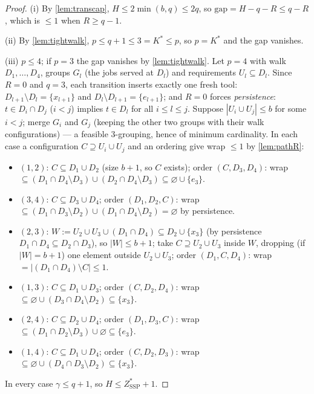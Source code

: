 \documentclass[11pt,a4paper]{article}
\theoremstyle{plain}
\theoremstyle{definition}
\newcommand{\Kstar}{K^{*}}
\newcommand{\ZSSP}{Z_{\mathrm{SSP}}^{*}}
\begin{document}
\begin{proofbox}
\begin{proof}
(i) By \cref{lem:transcap}, $H\le2\min(b,q)\le2q$, so
$\mathrm{gap}=H-q-R\le q-R$, which is $\le1$ when $R\ge q-1$.

(ii) By \cref{lem:tightwalk}, $p\le q+1\le3=\Kstar\le p$, so $p=\Kstar$ and the
gap vanishes.

(iii) $p\le4$; if $p=3$ the gap vanishes by \cref{lem:tightwalk}. Let $p=4$ with
walk $D_1,\dots,D_4$, groups $G_l$ (the jobs served at $D_l$) and requirements
$U_l\subseteq D_l$. Since $R=0$ and $q=3$, each transition inserts exactly one
fresh tool: $D_{l+1}\setminus D_l=\{x_{l+1}\}$ and $D_l\setminus D_{l+1}=
\{e_{l+1}\}$; and $R=0$ forces \emph{persistence}: $t\in D_i\cap D_j$ ($i<j$)
implies $t\in D_l$ for all $i\le l\le j$. Suppose $|U_i\cup U_j|\le b$ for some
$i<j$; merge $G_i$ and $G_j$ (keeping the other two groups with their walk
configurations) --- a feasible $3$-grouping, hence of minimum cardinality. In each
case a configuration $C\supseteq U_i\cup U_j$ and an ordering give wrap $\le1$ by
\cref{lem:pathR}:
\begin{itemize}
\item $(1,2)$: $C\subseteq D_1\cup D_2$ (size $b{+}1$, so $C$ exists); order
$(C,D_3,D_4)$: wrap $\subseteq(D_1\cap D_4\setminus D_3)\cup(D_2\cap D_4\setminus
D_3)\subseteq\varnothing\cup\{e_3\}$.
\item $(3,4)$: $C\subseteq D_3\cup D_4$; order $(D_1,D_2,C)$: wrap
$\subseteq(D_1\cap D_3\setminus D_2)\cup(D_1\cap D_4\setminus D_2)=\varnothing$
by persistence.
\item $(2,3)$: $W:=U_2\cup U_3\cup(D_1\cap D_4)\subseteq D_2\cup\{x_3\}$ (by
persistence $D_1\cap D_4\subseteq D_2\cap D_3$), so $|W|\le b{+}1$; take
$C\supseteq U_2\cup U_3$ inside $W$, dropping (if $|W|=b{+}1$) one element outside
$U_2\cup U_3$; order $(D_1,C,D_4)$: wrap $=|(D_1\cap D_4)\setminus C|\le1$.
\item $(1,3)$: $C\subseteq D_1\cup D_3$; order $(C,D_2,D_4)$: wrap
$\subseteq\varnothing\cup(D_3\cap D_4\setminus D_2)\subseteq\{x_3\}$.
\item $(2,4)$: $C\subseteq D_2\cup D_4$; order $(D_1,D_3,C)$: wrap
$\subseteq(D_1\cap D_2\setminus D_3)\cup\varnothing\subseteq\{e_3\}$.
\item $(1,4)$: $C\subseteq D_1\cup D_4$; order $(C,D_2,D_3)$: wrap
$\subseteq\varnothing\cup(D_4\cap D_3\setminus D_2)\subseteq\{x_3\}$.
\end{itemize}
In every case $\gamma\le q+1$, so $H\le\ZSSP+1$.
\end{proof}
\end{proofbox}
\end{document}
